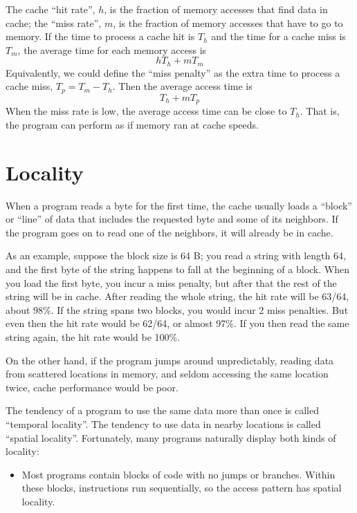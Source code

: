\documentclass[12pt]{book}
\begin{document}
{The cache ``hit rate'', $h$, is the fraction of memory accesses that
find data in cache; the ``miss rate'', $m$, is the fraction of memory
accesses that have to go to memory.  If the time to process a cache
hit is $T_h$ and the time for a cache miss is $T_m$, the average time
for each memory access is
%
\[ h T_h + m T_m \]
%
Equivalently, we could define the ``miss penalty'' as the extra
time to process a cache miss, $T_p = T_m - T_h$.  Then the average access
time is
%
\[ T_h + m T_p \]
%
When the miss rate is low, the average access time can be close to
$T_h$.  That is, the program can perform as if memory ran at
cache speeds.


\section{Locality}

When a program reads a byte for the first time, the cache usually
loads a ``block'' or ``line'' of data that includes the requested
byte and some of its neighbors.  If the program goes on to read one
of the neighbors, it will already be in cache.

As an example, suppose the block size is 64 B;
you read a string with length 64, and the first
byte of the string happens to fall at the beginning of a block.  When
you load the first byte, you incur a miss penalty, but
after that the rest of the string will be in cache.  After
reading the whole string, the hit rate will be 63/64, about 98\%.
If the string spans two blocks, you would incur 2 miss penalties.  But
even then the hit rate would be 62/64, or almost 97\%.  If you then
read the same string again, the hit rate would be 100\%.

On the other hand, if the program jumps around unpredictably,
reading data from scattered locations in memory, and seldom
accessing the same location twice, cache performance would be
poor.

The tendency of a program to use the same data more than once is
called ``temporal locality''.  The tendency to use data in nearby
locations is called ``spatial locality''.  Fortunately, many
programs naturally display both kinds of locality:

\begin{itemize}

\item Most programs contain blocks of code with no jumps or
branches.  Within these blocks, instructions run
sequentially, so the access pattern has
spatial locality.


\end{itemize}}
\end{document}
